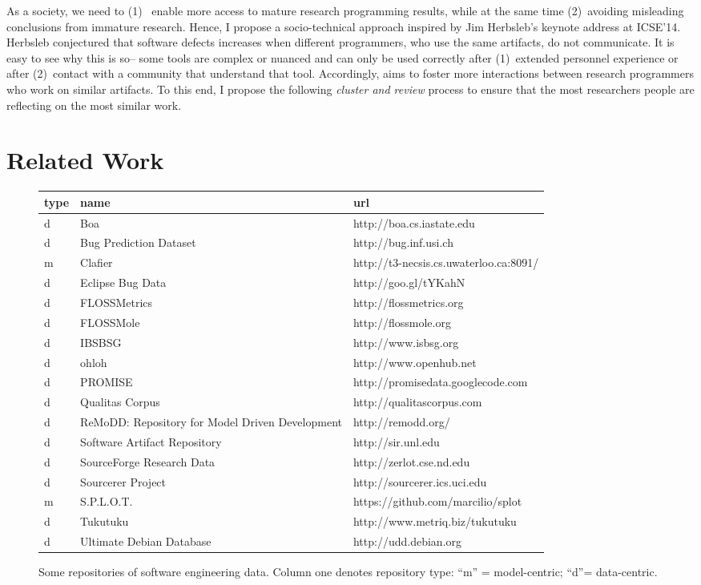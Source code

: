 \documentclass[journal]{IEEEtran}
\begin{document}
As a society,     we need  to (1)~ enable more access to mature  research programming results, while at the same
time (2)~avoiding   misleading conclusions from immature research.
Hence, I propose a socio-technical approach inspired by  Jim Herbsleb's
keynote address at  ICSE'14.
Herbsleb conjectured  that software defects increases when different  programmers, who use the same artifacts, do not communicate.  It is easy to
see why this is so-- some tools are complex or nuanced and can only be used correctly after (1)~extended personnel experience or after (2)~contact with a community
that understand that tool. Accordingly, {\IT} aims to foster
more interactions between research programmers who work on similar artifacts.
To this end, I propose the following {\em cluster and review} process to ensure that the
 most researchers people are reflecting on the most similar work.


 \section{Related Work}\label{sect:rw}



\begin{figure*} 
\begin{center}
\footnotesize\begin{tabular}{lll} 
type & name & url\\\hline
d&Boa & http://boa.cs.iastate.edu\\
d&Bug Prediction Dataset &http://bug.inf.usi.ch \\
m&Clafier & http://t3-necsis.cs.uwaterloo.ca:8091/\\
d&Eclipse Bug Data &http://goo.gl/tYKahN \\
d&FLOSSMetrics& http://flossmetrics.org \\
d&FLOSSMole &http://flossmole.org \\
d&IBSBSG& http://www.isbsg.org \\
d&ohloh& http://www.openhub.net \\
d&PROMISE &http://promisedata.googlecode.com \\
d&Qualitas Corpus &http://qualitascorpus.com \\
d&ReMoDD: Repository for Model Driven Development &http://remodd.org/\\
d&Software Artifact Repository &http://sir.unl.edu \\
d&SourceForge Research Data &http://zerlot.cse.nd.edu \\
d&Sourcerer Project &http://sourcerer.ics.uci.edu \\
m& S.P.L.O.T.& https://github.com/marcilio/splot\\
d&Tukutuku &http://www.metriq.biz/tukutuku \\
d&Ultimate Debian Database &http://udd.debian.org\\ 
\end{tabular}
\end{center}
\caption{Some repositories of software engineering data. Column one denotes repository type: ``m'' = model-centric; ``d''= data-centric.}\label{fig:sedata}
\end{figure*}
\end{document}
